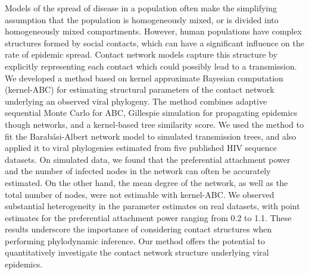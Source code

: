 Models of the spread of disease in a population often make the simplifying
assumption that the population is homogeneously mixed, or is divided into
homogeneously mixed compartments. However, human populations have complex
structures formed by social contacts, which can have a significant influence on
the rate of epidemic spread. Contact network models capture this structure by
explicitly representing each contact which could possibly lead to a
transmission. We developed a method based on kernel approximate Bayesian
computation (kernel-ABC) for estimating structural parameters of the contact
network underlying an observed viral phylogeny. The method combines adaptive
sequential Monte Carlo for ABC, Gillespie simulation for propagating epidemics
though networks, and a kernel-based tree similarity score. We used the method
to fit the Barab\'{a}si-Albert network model to simulated transmission trees,
and also applied it to viral phylogenies estimated from five published HIV
sequence datasets. On simulated data, we found that the preferential attachment
power and the number of infected nodes in the network can often be accurately
estimated. On the other hand, the mean degree of the network, as well as the
total number of nodes, were not estimable with kernel-ABC. We observed
substantial heterogeneity in the parameter estimates on real datasets, with
point estimates for the preferential attachment power ranging from 0.2 to 1.1.
These results underscore the importance of considering contact structures when
performing phylodynamic inference. Our method offers the potential to
quantitatively investigate the contact network structure underlying viral
epidemics.
